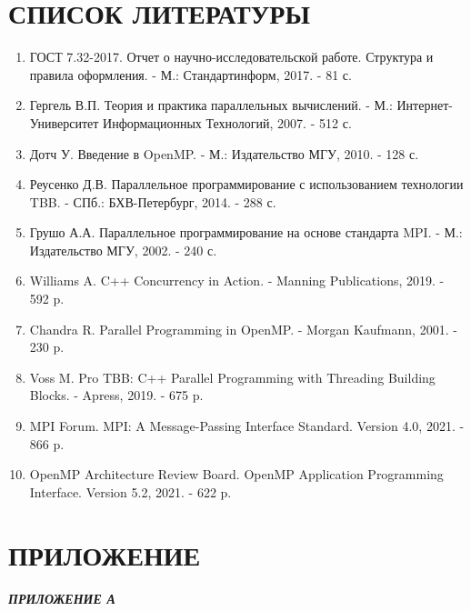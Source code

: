 \documentclass[14pt,a4paper]{article}
\begin{document}
\newpage

\section{СПИСОК ЛИТЕРАТУРЫ}

\begin{enumerate}
\item ГОСТ 7.32-2017. Отчет о научно-исследовательской работе. Структура и правила оформления. - М.: Стандартинформ, 2017. - 81 с.

\item Гергель В.П. Теория и практика параллельных вычислений. - М.: Интернет-Университет Информационных Технологий, 2007. - 512 с.

\item Дотч У. Введение в OpenMP. - М.: Издательство МГУ, 2010. - 128 с.

\item Реусенко Д.В. Параллельное программирование с использованием технологии TBB. - СПб.: БХВ-Петербург, 2014. - 288 с.

\item Грушо А.А. Параллельное программирование на основе стандарта MPI. - М.: Издательство МГУ, 2002. - 240 с.

\item Williams A. C++ Concurrency in Action. - Manning Publications, 2019. - 592 p.

\item Chandra R. Parallel Programming in OpenMP. - Morgan Kaufmann, 2001. - 230 p.

\item Voss M. Pro TBB: C++ Parallel Programming with Threading Building Blocks. - Apress, 2019. - 675 p.

\item MPI Forum. MPI: A Message-Passing Interface Standard. Version 4.0, 2021. - 866 p.

\item OpenMP Architecture Review Board. OpenMP Application Programming Interface. Version 5.2, 2021. - 622 p.
\end{enumerate}

\newpage

\section{ПРИЛОЖЕНИЕ}

{\raggedright\textit{\large\bfseries ПРИЛОЖЕНИЕ А}\par}
\end{document}
